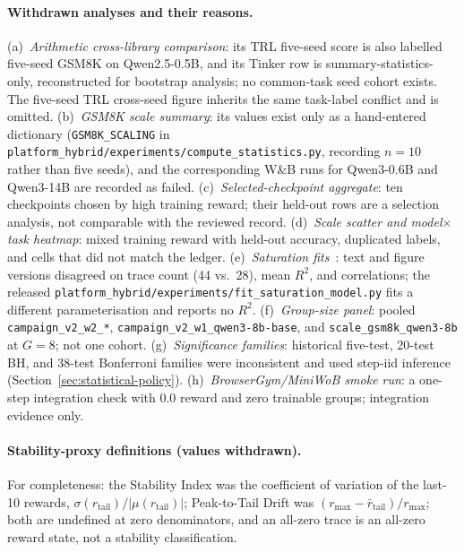 \documentclass{article}
\begin{document}
\paragraph{Withdrawn analyses and their reasons.}
(a)~\emph{Arithmetic cross-library comparison}: its TRL five-seed score is also
labelled five-seed GSM8K on Qwen2.5-0.5B, and its Tinker row is
summary-statistics-only, reconstructed for bootstrap analysis; no common-task
seed cohort exists. The five-seed TRL cross-seed figure inherits the same
task-label conflict and is omitted.
(b)~\emph{GSM8K scale summary}: its values exist only as a hand-entered
dictionary (\texttt{GSM8K\_SCALING} in
\texttt{platform\_hybrid/experiments/compute\_statistics.py}, recording $n=10$
rather than five seeds), and the corresponding W\&B runs for Qwen3-0.6B and
Qwen3-14B are recorded as failed.
(c)~\emph{Selected-checkpoint aggregate}: ten checkpoints chosen by high
training reward; their held-out rows are a selection analysis, not comparable
with the reviewed record.
(d)~\emph{Scale scatter and model$\times$task heatmap}: mixed training reward
with held-out accuracy, duplicated labels, and cells that did not match the
ledger.
(e)~\emph{Saturation fits}~\citep{nimmaturi2025predictive}: text and figure
versions disagreed on trace count (44 vs.\ 28), mean $R^2$, and correlations;
the released \texttt{platform\_hybrid/experiments/fit\_saturation\_model.py}
fits a different parameterisation and reports no $R^2$.
(f)~\emph{Group-size panel}: pooled \texttt{campaign\_v2\_w2\_*},
\texttt{campaign\_v2\_w1\_qwen3-8b-base}, and \texttt{scale\_gsm8k\_qwen3-8b}
at $G=8$; not one cohort.
(g)~\emph{Significance families}: historical five-test, 20-test BH, and
38-test Bonferroni families were inconsistent and used step-iid inference
(Section~\ref{sec:statistical-policy}).
(h)~\emph{BrowserGym/MiniWoB smoke run}: a one-step integration check with 0.0
reward and zero trainable groups; integration evidence only.

\paragraph{Stability-proxy definitions (values withdrawn).}
For completeness: the Stability Index was the coefficient of variation of the
last-10 rewards, $\sigma(r_{\text{tail}})/|\mu(r_{\text{tail}})|$; Peak-to-Tail
Drift was $(r_{\max}-\bar r_{\text{tail}})/r_{\max}$; both are undefined at zero
denominators, and an all-zero trace is an all-zero reward state, not a stability
classification.




\end{document}
